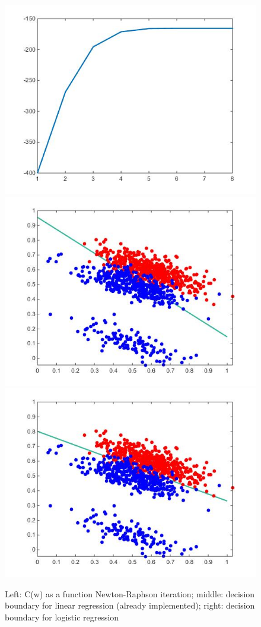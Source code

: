 \documentclass[a4paper, 12pt]{article}
\begin{document}
\begin{figure}[!htbp]
\centering
\noindent\includegraphics[scale=0.4]{images/ass1-img1.jpg}
\noindent\includegraphics[scale=0.4]{images/ass1-img2.jpg}
\noindent\includegraphics[scale=0.4]{images/ass1-img3.jpg}
\caption{Left: C(w) as a function Newton-Raphson iteration; middle: decision boundary for linear regression (already implemented); right: decision boundary for logistic regression}
\end{figure}
\end{document}
